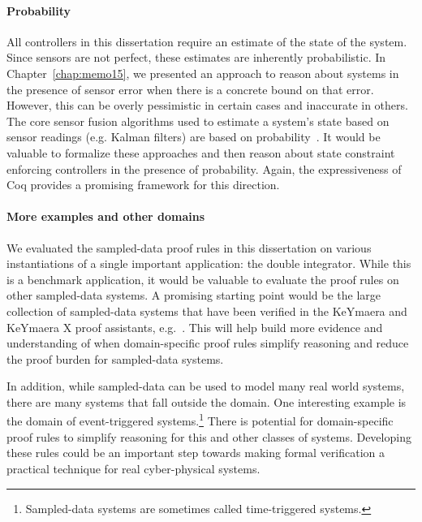 \paragraph{Probability}
All controllers in this dissertation require an estimate of the state of
the system. Since sensors are not perfect, these estimates are inherently
probabilistic. In Chapter~\ref{chap:memo15}, we presented an approach to
reason about systems in the presence of sensor error when there is a
concrete bound on that error. However, this can be overly pessimistic in
certain cases and inaccurate in others. The core sensor fusion algorithms
used to estimate a system's state based on sensor readings (e.g. Kalman
filters) are based on probability~\cite{Simon06estimation}. It would be
valuable to formalize these approaches and then reason about state
constraint enforcing controllers in the presence of probability. Again, the
expressiveness of Coq provides a promising framework for this direction.

\paragraph{More examples and other domains}
We evaluated the sampled-data proof rules in this dissertation on various
instantiations of a single important application: the double
integrator. While this is a benchmark application, it would be valuable to
evaluate the proof rules on other sampled-data systems. A promising
starting point would be the large collection of sampled-data systems that
have been verified in the KeYmaera and KeYmaera X proof assistants,
e.g.~\cite{platzercruise11,platzerrobots13}. This will help build more
evidence and understanding of when domain-specific proof rules simplify
reasoning and reduce the proof burden for sampled-data systems.

In addition, while sampled-data can be used to model many real world
systems, there are many systems that fall outside the domain. One
interesting example is the domain of event-triggered
systems.\footnote{Sampled-data systems are sometimes called time-triggered
  systems.} There is potential for domain-specific proof rules to simplify
reasoning for this and other classes of systems. Developing these rules
could be an important step towards making formal verification a practical
technique for real cyber-physical systems.
